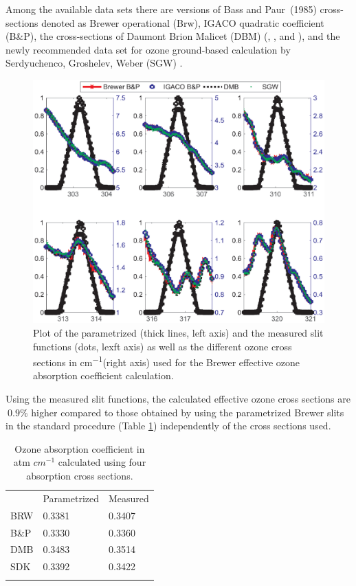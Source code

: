\documentclass[acp, manuscript]{copernicus}
\begin{document}
Among the available data sets there are versions of Bass and Paur~(1985) cross-sections denoted as Brewer operational (Brw), IGACO quadratic coefficient (B\&P), the cross-sections of  Daumont Brion Malicet (DBM) (\citet{ daumont_ozone_1992}, \citet{brion_high-resolution_1993}, and \citet{malicet_ozone_1995} ), and the newly recommended data set for ozone ground-based calculation by Serdyuchenco, Groshelev, Weber (SGW) \citep{serdyuchenko_high_2012,gorshelev_high_2012,amt-9-4459-2016}. 

\begin{figure}[t]
\includegraphics[width=12cm]{figures/General_Laser_Brewer_ozone_mode.eps}
\caption{ Plot of the parametrized (thick lines, left axis) and the measured slit functions (dots, lexft axis) as well as the different ozone cross sections in \unit{cm^{-1}}(right axis) used for the Brewer effective ozone absorption coefficient calculation.}
\label{fig:param}
\end{figure}


Using the measured slit functions, the calculated effective ozone cross sections are $~0.9\%$ higher compared to those obtained by using the parametrized Brewer slits in the standard procedure (Table \ref{tab:slit_param}) independently of the cross sections used.

\begin{table}[t]
\caption{Ozone absorption coefficient in atm $cm^{-1}$ calculated using four absorption cross sections.}
\begin{tabular}{lll}
\tophline
     & Parametrized & Measured \\
\middlehline
BRW  & 0.3381       & 0.3407   \\
B\&P & 0.3330       & 0.3360    \\
DMB  & 0.3483       & 0.3514   \\
SDK  & 0.3392       & 0.3422    \\
\bottomhline
\end{tabular}
\belowtable{} %
\label{tab:slit_param}
\end{table}
\end{document}
